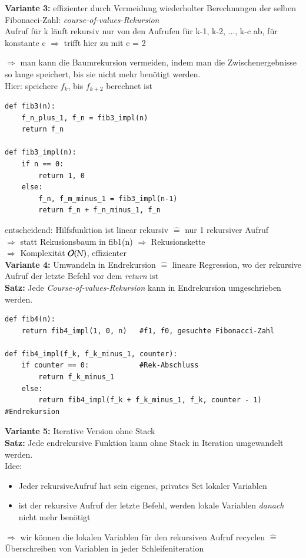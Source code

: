 \textbf{Variante 3:} effizienter durch Vermeidung wiederholter Berechnungen der selben Fibonacci-Zahl: \emph{course-of-values-Rekursion} \\

Aufruf für k läuft rekursiv nur von den Aufrufen für k-1, k-2, ..., k-c ab, für konstante c $\Rightarrow$ trifft hier zu mit c = 2

$\Rightarrow$ man kann die Baumrekursion vermeiden, indem man die Zwischenergebnisse so lange speichert, bis sie nicht mehr benötigt werden. \\

Hier: speichere $f_k$, bis $f_{k+2}$ berechnet ist
\begin{verbatim}
def fib3(n):
    f_n_plus_1, f_n = fib3_impl(n)
    return f_n

def fib3_impl(n):
    if n == 0:
        return 1, 0
    else:
        f_n, f_m_minus_1 = fib3_impl(n-1)
        return f_n + f_n_minus_1, f_n
\end{verbatim}
entscheidend: Hilfsfunktion ist linear rekursiv $\widehat{=}$ nur 1 rekursiver Aufruf \\
$\Rightarrow$ statt Rekusionsbaum in fib1(n) $\Rightarrow$ Rekusionskette\\
$\Rightarrow$ Komplexität $\mathcal{O}{}(N)$, effizienter\\

\textbf{Variante 4:} Umwandeln in Endrekursion $\widehat{=}$ lineare Regression, wo der rekursive Aufruf der letzte Befehl vor dem \emph{return} ist \\

\textbf{Satz:} Jede \emph{Course-of-values-Rekursion} kann in Endrekursion umgeschrieben werden.

\begin{verbatim}
def fib4(n):
    return fib4_impl(1, 0, n)   #f1, f0, gesuchte Fibonacci-Zahl

def fib4_impl(f_k, f_k_minus_1, counter):
    if counter == 0:            #Rek-Abschluss
        return f_k_minus_1
    else:
        return fib4_impl(f_k + f_k_minus_1, f_k, counter - 1)   #Endrekursion
\end{verbatim}

\textbf{Variante 5: }Iterative Version ohne Stack\\

\textbf{Satz:} Jede endrekursive Funktion kann ohne Stack in Iteration umgewandelt werden. \\
Idee:
\begin{itemize}
    \item Jeder rekursiveAufruf hat sein eigenes, privates Set lokaler Variablen
    \item ist der rekursive Aufruf der letzte Befehl, werden lokale Variablen \emph{danach} nicht mehr benötigt
\end{itemize}
$\Rightarrow$ wir können die lokalen Variablen für den rekursiven Aufruf recyclen $\widehat{=}$ Überschreiben von Variablen in jeder Schleifeniteration \\

